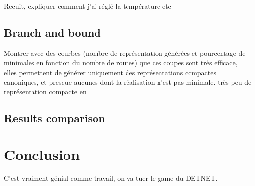 \documentclass[english]{article}
\begin{document}
Recuit, expliquer comment j'ai réglé la température etc\\


\subsection{Branch and bound}

Montrer avec des courbes (nombre de représentation générées et pourcentage de minimales en fonction du nombre de routes) que ces coupes sont très efficace, elles permettent de générer uniquement des représentations compactes canoniques, et presque aucunes dont la réalisation n'est pas minimale.
très peu de représentation compacte en  



\subsection{Results comparison}

\section{Conclusion}
C'est vraiment génial comme travail, on va tuer le game du DETNET.



\end{document}
